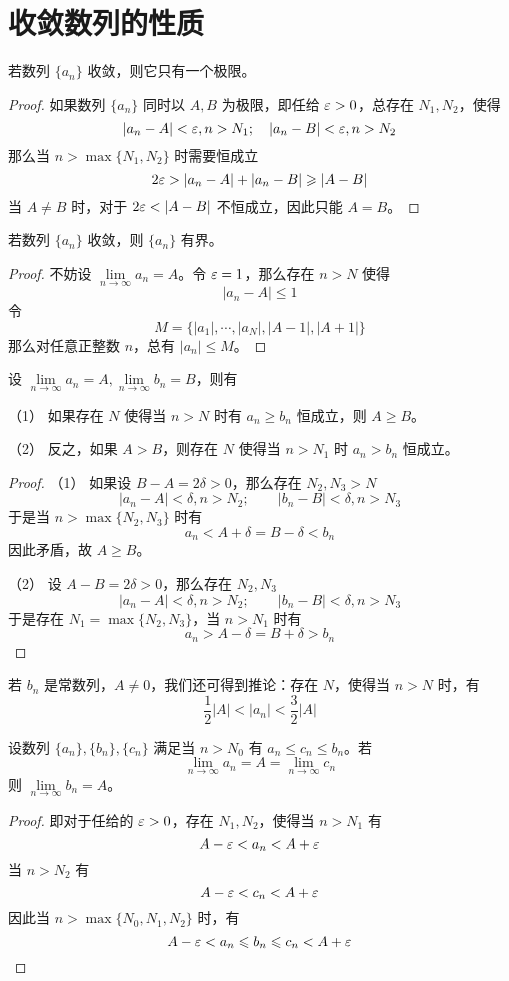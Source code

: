 \section{收敛数列的性质}

\begin{theorem}[唯一性]
	若数列 $\{a_n\}$ 收敛，则它只有一个极限。
\end{theorem}

\begin{proof}
	如果数列 $\{a_n\}$ 同时以 $A,B$ 为极限，即任给 $\varepsilon>0$，总存在 $N_1,N_2$，使得
	\[|a_n-A|<\varepsilon,n>N_1;\quad |a_n-B|<\varepsilon,n>N_2\]
	那么当 $n>\max\{N_1,N_2\}$ 时需要恒成立
	\[2\varepsilon > |a_n-A|+|a_n-B| \geqslant |A-B|\]
	当 $A\ne B$ 时，对于 $2\eps <|A-B|$ 不恒成立，因此只能 $A=B$。
\end{proof}

\begin{theorem}[有界性]
	若数列 $\{a_n\}$ 收敛，则 $\{a_n\}$ 有界。
\end{theorem}

\begin{proof}
	不妨设 $\lim\limits_{n\to \infty} a_n = A$。令 $\varepsilon = 1$，那么存在 $n>N$ 使得
	\[|a_n-A| \leqslant 1\]
	令
	\[M = \{|a_1|,\cdots,|a_N|,|A-1|,|A+1|\}\]
	那么对任意正整数 $n$，总有 $|a_n|\leqslant M$。
\end{proof}

\begin{theorem}[保序性]
	设 $\lim\limits_{n\to \infty} a_n = A,\lim\limits_{n\to \infty} b_n = B$，则有

	（1） 如果存在 $N$ 使得当 $n>N$ 时有 $a_n\geqslant b_n$ 恒成立，则 $A\geqslant B$。

	（2） 反之，如果 $A>B$，则存在 $N$ 使得当 $n>N_1$ 时 $a_n>b_n$ 恒成立。
\end{theorem}
\begin{proof}
	（1） 如果设 $B-A=2\delta>0$，那么存在 $N_2,N_3>N$
	\[|a_n-A|<\delta,n>N_2;\qquad |b_n-B|<\delta,n>N_3\]
	于是当 $n>\max\{N_2,N_3\}$ 时有
	\[a_n<A+\delta=B-\delta<b_n\]
	因此矛盾，故 $A\geqslant B$。

	（2） 设 $A-B=2\delta>0$，那么存在 $N_2,N_3$
	\[|a_n-A|<\delta,n>N_2;\qquad |b_n-B|<\delta,n>N_3\]
	于是存在 $N_1=\max\{N_2,N_3\}$，当 $n>N_1$ 时有
	\[a_n>A-\delta=B+\delta>b_n\]
\end{proof}

若 $b_n$ 是常数列，$A\ne 0$，我们还可得到推论：存在 $N$，使得当 $n>N$ 时，有
\[ \frac{1}{2}|A| < |a_n| < \frac{3}{2}|A| \]

\begin{theorem}
	设数列 $\{a_n\},\{b_n\},\{c_n\}$ 满足当 $n>N_0$ 有 $a_n\leqslant c_n\leqslant b_n$。若
	\[\lim_{n\to \infty}a_n = A = \lim_{n\to \infty}c_n\]
	则 $\lim\limits_{n\to \infty}b_n = A$。
\end{theorem}
\begin{proof}
	即对于任给的 $\varepsilon>0$，存在 $N_1,N_2$，使得当 $n>N_1$ 有
	\[A-\varepsilon<a_n<A+\varepsilon\]
	当 $n>N_2$ 有
	\[A-\varepsilon<c_n<A+\varepsilon\]
	因此当 $n>\max\{N_0,N_1,N_2\}$ 时，有
	\[A-\varepsilon < a_n \leqslant b_n \leqslant c_n < A+\varepsilon\]
\end{proof}

